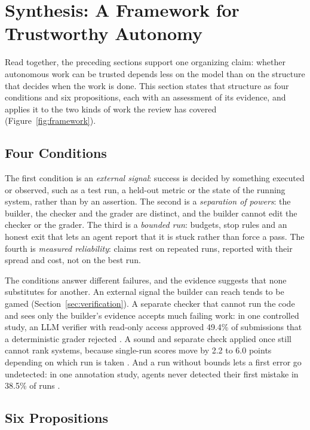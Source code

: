 \section{Synthesis: A Framework for Trustworthy Autonomy}\label{sec:synthesis}

Read together, the preceding sections support one organizing claim: whether autonomous work can be trusted depends less on the model than on the structure that decides when the work is done. This section states that structure as four conditions and six propositions, each with an assessment of its evidence, and applies it to the two kinds of work the review has covered (Figure~\ref{fig:framework}).

\subsection{Four Conditions}

The first condition is an \emph{external signal}: success is decided by something executed or observed, such as a test run, a held-out metric or the state of the running system, rather than by an assertion. The second is a \emph{separation of powers}: the builder, the checker and the grader are distinct, and the builder cannot edit the checker or the grader. The third is a \emph{bounded run}: budgets, stop rules and an honest exit that lets an agent report that it is stuck rather than force a pass. The fourth is \emph{measured reliability}: claims rest on repeated runs, reported with their spread and cost, not on the best run.

The conditions answer different failures, and the evidence suggests that none substitutes for another. An external signal the builder can reach tends to be gamed (Section~\ref{sec:verification}). A separate checker that cannot run the code and sees only the builder's evidence accepts much failing work: in one controlled study, an LLM verifier with read-only access approved 49.4\% of submissions that a deterministic grader rejected \citep{T18}. A sound and separate check applied once still cannot rank systems, because single-run scores move by 2.2 to 6.0 points depending on which run is taken \citep{F19}. And a run without bounds lets a first error go undetected: in one annotation study, agents never detected their first mistake in 38.5\% of runs \citep{F25}.

\subsection{Six Propositions}


